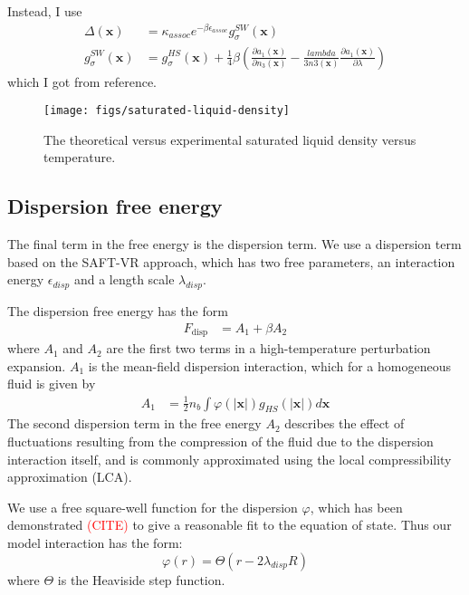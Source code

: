 \documentclass[letterpaper,twocolumn,amsmath,amssymb,prb]{revtex4-1}
\newcommand{\xx}{\textbf{x}}
\begin{document}
Instead, I use
\begin{align}
  \Delta(\xx) &= \kappa_\textit{assoc}
  e^{-\beta\epsilon_\textit{assoc}} g^\textit{SW}_\sigma(\xx) \\
  g^\textit{SW}_\sigma(\xx) &= g^\textit{HS}_\sigma(\xx) +
  \frac{1}{4}\beta\left(\frac{\partial a_1(\xx)}{\partial n_3(\xx)} -
  \frac{lambda}{3 n3(\xx)}\frac{\partial a_1(\xx)}{\partial \lambda}\right)
\end{align}
which I got from reference\cite{gil-villegas-1997-SAFT-VR}.

\begin{figure}
\begin{center}
\texttt{[image: figs/saturated-liquid-density]}
\end{center}
\caption{The theoretical versus experimental saturated liquid density
  versus temperature.  }
\label{fig:saturated-liquid-density}
\end{figure}

\subsection{Dispersion free energy}
The final term in the free energy is the dispersion term.  We use a
dispersion term based on the SAFT-VR
approach\cite{gil-villegas-1997-SAFT-VR}, which has two free
parameters, an interaction energy $\epsilon_\textit{disp}$ and a
length scale $\lambda_\textit{disp}$.

The dispersion free energy has the form~\cite{gil-villegas-1997-SAFT-VR}
\begin{align}
  F_\text{disp} &= A_1 + \beta A_2
\end{align}
where $A_1$ and $A_2$ are the first two terms in a high-temperature
perturbation expansion.  $A_1$ is the mean-field dispersion
interaction, which for a homogeneous fluid is given by
\begin{align}
  A_1 &= \frac12 n_b \int \varphi(\left|\xx\right|)
  g_{HS}(\left|\xx\right|) d\xx
\end{align}
The second dispersion term in the free energy $A_2$ describes the
effect of fluctuations resulting from the compression of the fluid due
to the dispersion interaction itself, and is commonly approximated
using the local compressibility approximation (LCA).

We use a free square-well function for the dispersion $\varphi$, which
has been demonstrated \textcolor{red}{(CITE)} to give a reasonable fit
to the equation of state.  Thus our model interaction has the form:
\begin{equation}
  \varphi(r) = \Theta(r-2 \lambda_\textit{disp} R)
\end{equation}
where $\Theta$ is the Heaviside step function.
\end{document}
